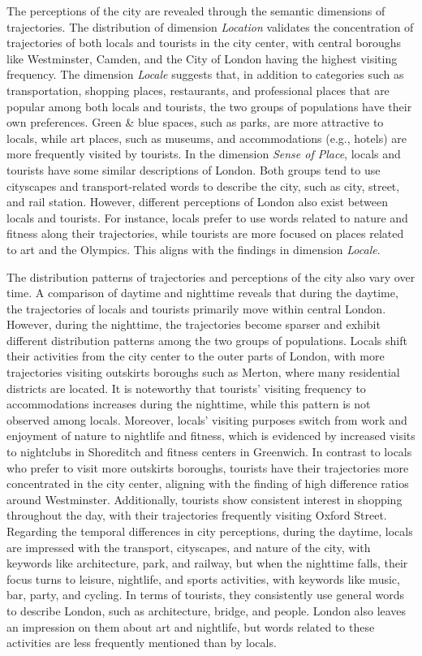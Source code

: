 \documentclass{article}
\theoremstyle{remark}
\begin{document}
The perceptions of the city are revealed through the semantic dimensions of trajectories. The distribution of dimension \textit{Location} validates the concentration of trajectories of both locals and tourists in the city center, with central boroughs like Westminster, Camden, and the City of London having the highest visiting frequency. The dimension \textit{Locale} suggests that, in addition to categories such as transportation, shopping places, restaurants, and professional places that are popular among both locals and tourists, the two groups of populations have their own preferences. Green \& blue spaces, such as parks, are more attractive to locals, while art places, such as museums, and accommodations (e.g., hotels) are more frequently visited by tourists. In the dimension \textit{Sense of Place}, locals and tourists have some similar descriptions of London. Both groups tend to use cityscapes and transport-related words to describe the city, such as city, street, and rail station. However, different perceptions of London also exist between locals and tourists. For instance, locals prefer to use words related to nature and fitness along their trajectories, while tourists are more focused on places related to art and the Olympics. This aligns with the findings in dimension \textit{Locale}.


The distribution patterns of trajectories and perceptions of the city also vary over time. A comparison of daytime and nighttime reveals that during the daytime, the trajectories of locals and tourists primarily move within central London. However, during the nighttime, the trajectories become sparser and exhibit different distribution patterns among the two groups of populations. Locals shift their activities from the city center to the outer parts of London, with more trajectories visiting outskirts boroughs such as Merton, where many residential districts are located. It is noteworthy that tourists' visiting frequency to accommodations increases during the nighttime, while this pattern is not observed among locals. Moreover, locals' visiting purposes switch from work and enjoyment of nature to nightlife and fitness, which is evidenced by increased visits to nightclubs in Shoreditch and fitness centers in Greenwich. In contrast to locals who prefer to visit more outskirts boroughs, tourists have their trajectories more concentrated in the city center, aligning with the finding of high difference ratios around Westminster. Additionally, tourists show consistent interest in shopping throughout the day, with their trajectories frequently visiting Oxford Street. Regarding the temporal differences in city perceptions, during the daytime, locals are impressed with the transport, cityscapes, and nature of the city, with keywords like architecture, park, and railway, but when the nighttime falls, their focus turns to leisure, nightlife, and sports activities, with keywords like music, bar, party, and cycling. In terms of tourists, they consistently use general words to describe London, such as architecture, bridge, and people. London also leaves an impression on them about art and nightlife, but words related to these activities are less frequently mentioned than by locals.
\end{document}
